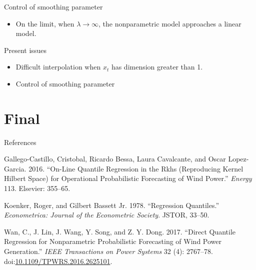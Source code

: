 \begin{frame}{Control of smoothing parameter}
\begin{figure}
\begin{minipage}[t]{\linewidth}
\begin{minipage}[t]{0.45\linewidth}
    \end{minipage}
  \end{minipage}
\end{figure}

\begin{itemize}
\tightlist
\item
  On the limit, when \(\lambda \rightarrow \infty\), the nonparametric
  model approaches a linear model.
\end{itemize}

\end{frame}

\begin{frame}{Present issues}

\begin{itemize}
\tightlist
\item
  Difficult interpolation when \(x_t\) has dimension greater than 1.
\item
  Control of smoothing parameter
\end{itemize}

\end{frame}

\section{Final}\label{final}

\begin{frame}{References}

\tiny

\hypertarget{refs}{}
\hypertarget{ref-gallego2016line}{}
Gallego-Castillo, Cristobal, Ricardo Bessa, Laura Cavalcante, and Oscar
Lopez-Garcia. 2016. ``On-Line Quantile Regression in the Rkhs
(Reproducing Kernel Hilbert Space) for Operational Probabilistic
Forecasting of Wind Power.'' \emph{Energy} 113. Elsevier: 355--65.

\hypertarget{ref-koenker1978regression}{}
Koenker, Roger, and Gilbert Bassett Jr. 1978. ``Regression Quantiles.''
\emph{Econometrica: Journal of the Econometric Society}. JSTOR, 33--50.

\hypertarget{ref-wan_direct_2017}{}
Wan, C., J. Lin, J. Wang, Y. Song, and Z. Y. Dong. 2017. ``Direct
Quantile Regression for Nonparametric Probabilistic Forecasting of Wind
Power Generation.'' \emph{IEEE Transactions on Power Systems} 32 (4):
2767--78.
doi:\href{https://doi.org/10.1109/TPWRS.2016.2625101}{10.1109/TPWRS.2016.2625101}.

\end{frame}
